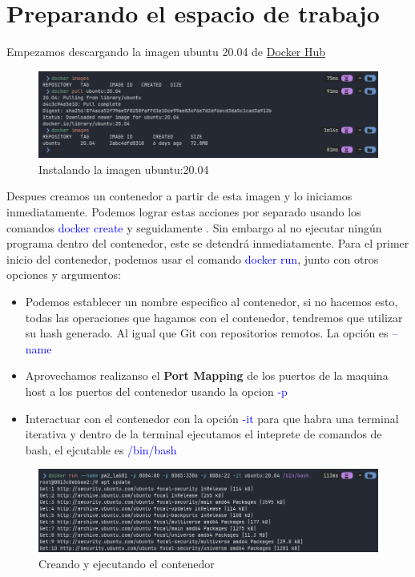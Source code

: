 \section{Preparando el espacio de trabajo}
Empezamos descargando la imagen ubuntu 20.04 de \href{https://hub.docker.com/\_/ubuntu}{Docker Hub}

\begin{figure}[H]
  \centering
  \includegraphics[width=1.0\textwidth]{img/ubuntu_image.png}
  \caption{Instalando la imagen ubuntu:20.04}
\end{figure}

Despues creamos un contenedor a partir de esta imagen y lo iniciamos inmediatamente. Podemos lograr estas 
acciones por separado usando los comandos \textcolor{blue}{docker create} y seguidamente . Sin embargo al no ejecutar ningún programa dentro del contenedor, este se detendrá inmediatamente. 
\singlespacing
Para el primer inicio del contenedor, podemos usar el comando \textcolor{blue}{docker run}, junto con otros 
opciones y argumentos:\\ 

\begin{itemize}
  \item Podemos establecer un nombre especifico al contenedor, si no hacemos esto, todas las operaciones que hagamos con el contenedor, tendremos que utilizar su hash generado. Al igual que Git con repositorios remotos. La opción es \textcolor{blue}{--name}
  \item Aprovechamos realizanso el \textbf{Port Mapping} de los puertos de la  maquina host a los puertos del contenedor usando la opcion \textcolor{blue}{-p}
  \item Interactuar con el contenedor con la opción \textcolor{blue}{-it} para que habra una terminal iterativa y dentro de la terminal  ejecutamos el inteprete de comandos de bash, el ejcutable es \textcolor{blue}{/bin/bash}
\end{itemize}

\begin{figure}[H]
  \centering
  \includegraphics[width=1.0\textwidth]{img/run_container.png}
  \caption{Creando y ejecutando el contenedor}
\end{figure}

